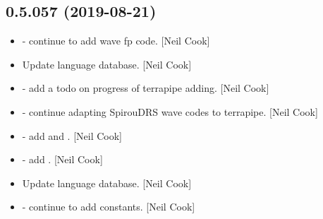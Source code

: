 \documentclass[a4paper,10pt,english]{report}
\begin{document}
\subsection{0.5.057 (2019-08-21)}
\label{\detokenize{misc/changelog:id85}}\begin{itemize}
\item {} 
 - continue to add wave fp code. {[}Neil Cook{]}

\item {} 
Update language database. {[}Neil Cook{]}

\item {} 
 - add a todo on progress of terrapipe adding. {[}Neil
Cook{]}

\item {} 
 - continue adapting SpirouDRS wave codes to
terrapipe. {[}Neil Cook{]}

\item {} 
 - add   and
. {[}Neil Cook{]}

\item {} 
 - add . {[}Neil Cook{]}

\item {} 
Update language database. {[}Neil Cook{]}

\item {} 
 - continue to add  constants. {[}Neil Cook{]}

\end{itemize}
\end{document}
